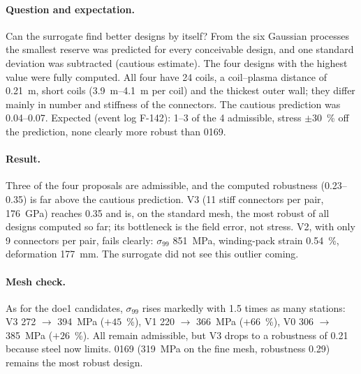 \paragraph{Question and expectation.} Can the surrogate find better designs by itself? From the six Gaussian processes
the smallest reserve was predicted for every conceivable design, and one standard deviation was subtracted (cautious
estimate). The four designs with the highest value were fully computed. All four have 24 coils, a coil--plasma
distance of \SI{0.21}{m}, short coils (\SIrange{3.9}{4.1}{m} per coil) and the thickest outer wall; they differ
mainly in number and stiffness of the connectors. The cautious prediction was 0.04--0.07. Expected (event log
F-142): 1--3 of the 4 admissible, stress $\pm30$~\% off the prediction, none clearly more robust than 0169.

\begin{table}[H]\centering\scriptsize\caption{Surrogate proposals. $E_\text{c}$ connector
stiffness, c./pair connectors per coil pair, ``fine'' = 1.5 times as many stations. Robustness = smallest reserve over
all eight limits; ``predicted'' = prediction minus one standard deviation.}
\end{table}

\paragraph{Result.} Three of the four proposals are admissible, and the computed robustness (0.23--0.35) is far above
the cautious prediction. V3 (11 stiff connectors per pair, \SI{176}{GPa}) reaches 0.35 and is, on the standard mesh,
the most robust of all designs computed so far; its bottleneck is the field error, not stress. V2, with only 9
connectors per pair, fails clearly: $\sigma_{99}$ \SI{851}{MPa}, winding-pack strain 0.54~\%, deformation
\SI{177}{mm}. The surrogate did not see this outlier coming.

\paragraph{Mesh check.} As for the doe1 candidates, $\sigma_{99}$ rises markedly with 1.5 times as many stations: V3
\SI{272}{} $\to$ \SI{394}{MPa} ($+45$~\%), V1 \SI{220}{} $\to$ \SI{366}{MPa} ($+66$~\%), V0 \SI{306}{} $\to$
\SI{385}{MPa} ($+26$~\%). All remain admissible, but V3 drops to a robustness of 0.21 because steel now limits. 0169
(\SI{319}{MPa} on the fine mesh, robustness 0.29) remains the most robust design.

